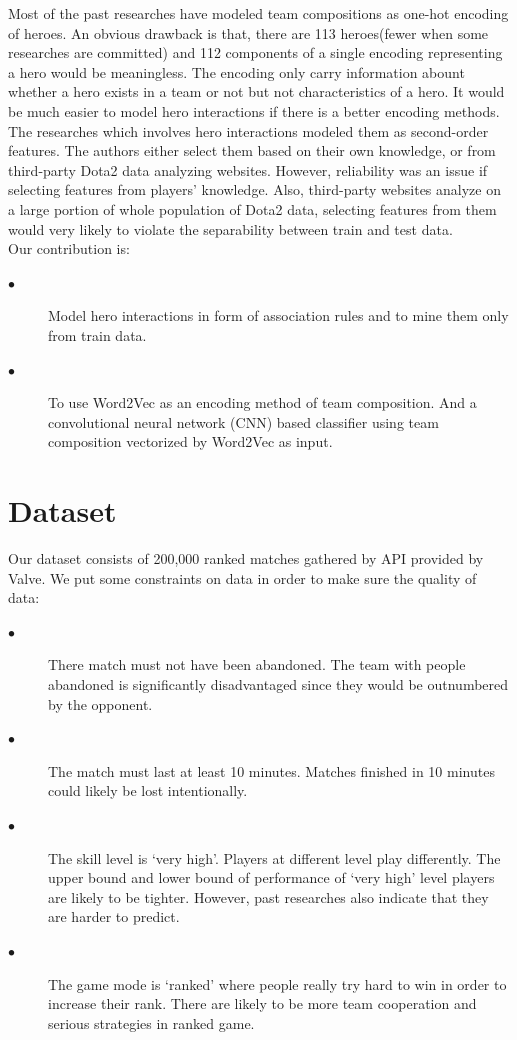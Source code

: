 \documentclass[12pt,openany,a4paper]{book}
\begin{document}
Most of the past researches have modeled team compositions as one-hot encoding of heroes. An obvious drawback is that, there are 113 heroes(fewer when some researches are committed) and 112 components of a single encoding representing a hero would be meaningless. The encoding only carry information abount whether a hero exists in a team or not but not characteristics of a hero. It would be much easier to model hero interactions if there is a better encoding methods.\\

The researches which involves hero interactions modeled them as second-order features. The authors either select them based on their own knowledge, or from third-party Dota2 data analyzing websites. However, reliability was an issue if selecting features from players' knowledge. Also, third-party websites analyze on a large portion of whole population of Dota2 data, selecting features from them would very likely to violate the separability between train and test data.\\

Our contribution is:
\begin{description}
  \item[$\bullet$ ] Model hero interactions in form of association rules and to mine them only from train data.
  \item[$\bullet$ ] To use Word2Vec as an encoding method of team composition. And a convolutional neural network (CNN) based classifier using team composition vectorized by Word2Vec as input.
\end{description}

\chapter{Dataset}
Our dataset consists of 200,000 ranked matches gathered by API provided by Valve. We put some constraints on data in order to make sure the quality of data:\\
\begin{description}
  \item[$\bullet$ ] There match must not have been abandoned. The team with people abandoned is significantly disadvantaged since they would be outnumbered by the opponent.
  \item[$\bullet$ ] The match must last at least 10 minutes. Matches finished in 10 minutes could likely be lost intentionally.
  \item[$\bullet$ ] The skill level is `very high'. Players at different level play differently. The upper bound and lower bound of performance of  `very high' level players are likely to be tighter. However, past researches also indicate that they are harder to predict.
  \item[$\bullet$ ] The game mode is `ranked' where people really try hard to win in order to increase their rank. There are likely to be more team cooperation and serious strategies in ranked game.
  \end{description}
\end{document}
